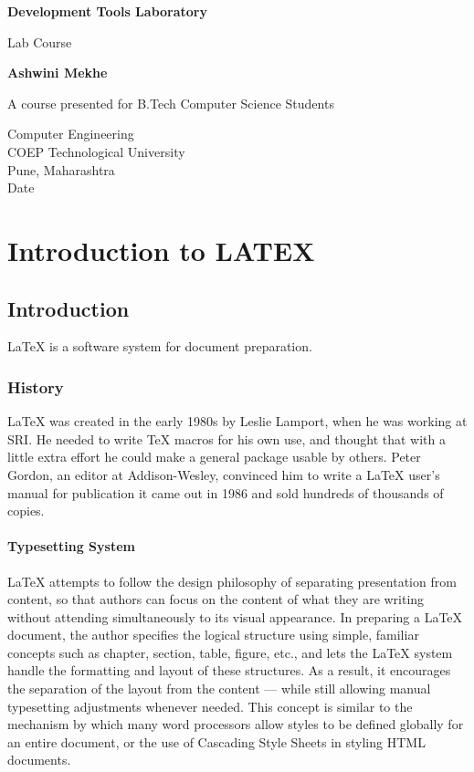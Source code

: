 \documentclass[11pt]{report}
\begin{document}
\begin{titlepage}
   \begin{center}
       \vspace*{5cm}

       \textbf{Development Tools Laboratory}

       \vspace{0.5cm}
        Lab Course
            
       \vspace{1.5cm}

       \textbf{Ashwini Mekhe}

       \vfill
            
       A course presented for B.Tech Computer Science Students\\
            
       \vspace{0.8cm}
     
       
            
       Computer Engineering\\
       COEP Technological University\\
       Pune, Maharashtra\\
       Date
            
   \end{center}
\end{titlepage}
\clearpage
\chapter{Introduction to LATEX}
\section{Introduction}
LaTeX is a software system for document preparation.
\subsection{History}
LaTeX was created in the early 1980s by Leslie Lamport, when he was working at SRI. He needed to write TeX macros for his own use, and thought that with a little extra effort he could make a general package usable by others. Peter Gordon, an editor at Addison-Wesley, convinced him to write a LaTeX user's manual for publication it came out in 1986 and sold hundreds of thousands of copies.
\subsubsection{Typesetting System}
LaTeX attempts to follow the design philosophy of separating presentation from content, so that authors can focus on the content of what they are writing without attending simultaneously to its visual appearance. In preparing a LaTeX document, the author specifies the logical structure using simple, familiar concepts such as chapter, section, table, figure, etc., and lets the LaTeX system handle the formatting and layout of these structures. As a result, it encourages the separation of the layout from the content — while still allowing manual typesetting adjustments whenever needed. This concept is similar to the mechanism by which many word processors allow styles to be defined globally for an entire document, or the use of Cascading Style Sheets in styling HTML documents.
\end{document}
